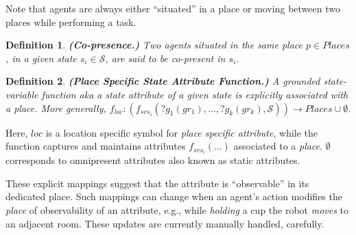 \documentclass[letterpaper]{article} %
\newtheorem{definition}{Definition}
\begin{document}

Note that agents are always either ``situated'' in a place or moving between two places while performing a task. 

\begin{definition} \label{def:copresence}
\textbf{(Co-presence.)} Two agents situated in the same place $p \in \mathit{Places}$, in a given state $s_i \in \mathcal{S}$, are said to be \textit{co-present} in $s_i$.
\end{definition}


\begin{definition} \label{def:pssav}
    \textbf{(Place Specific State Attribute Function.)} A {\em grounded} state-variable function {\em aka} a state attribute of a given state is explicitly associated with a place. More generally, 
    $f_{loc}: (f_{svs_i}(?g_1(gr_1),...,?g_k(gr_k),\mathcal{S})) \rightarrow Places \cup \emptyset$.
\end{definition}
Here, $\mathit{loc}$ is a location specific symbol for {\em place specific attribute}, while the function captures and maintains attributes $f_{svs_i}(...)$ associated to a \textit{place}. $\emptyset$ corresponds to omnipresent attributes also known as static attributes.


These explicit mappings suggest that the attribute is ``observable'' in its dedicated place. Such mappings can change when an agent's action modifies the \textit{place} of observability of an attribute, e.g., 
while \textit{holding} a cup the robot \textit{moves} to an adjacent room. 
These updates are currently manually handled, carefully.
\end{document}
